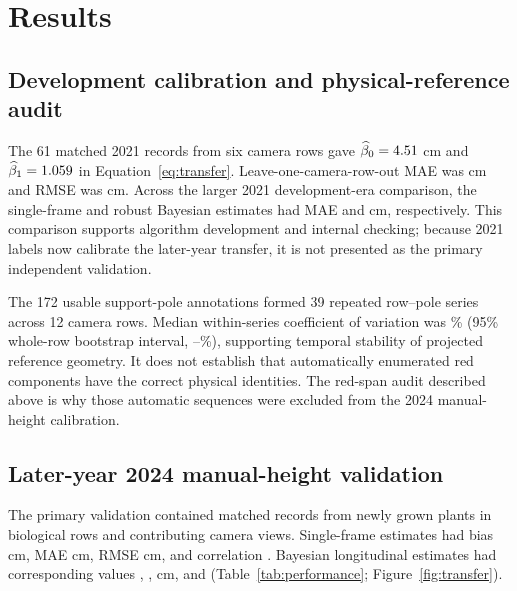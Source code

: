 \documentclass[review,12pt,authoryear]{elsarticle}
\begin{document}
\section{Results}

\subsection{Development calibration and physical-reference audit}

The 61 matched 2021 records from six camera rows gave $\widehat\beta_0=4.51{}$ cm and $\widehat\beta_1=1.059{}$ in Equation~\ref{eq:transfer}. Leave-one-camera-row-out MAE was \TransferDevCVMAE{} cm and RMSE was \TransferDevCVRMSE{} cm. Across the larger 2021 development-era comparison, the single-frame and robust Bayesian estimates had MAE \FieldSingleMAE{} and \FieldBayesMAE{} cm, respectively. This comparison supports algorithm development and internal checking; because 2021 labels now calibrate the later-year transfer, it is not presented as the primary independent validation.

The 172 usable support-pole annotations formed 39 repeated row--pole series across 12 camera rows. Median within-series coefficient of variation was \PoleRepeatabilityMedianCV{}\% (95\% whole-row bootstrap interval, \PoleRepeatabilityMedianCVLo{}--\PoleRepeatabilityMedianCVHi{}\%), supporting temporal stability of projected reference geometry. It does not establish that automatically enumerated red components have the correct physical identities. The red-span audit described above is why those automatic sequences were excluded from the 2024 manual-height calibration.

\subsection{Later-year 2024 manual-height validation}

The primary validation contained \TransferValidationN{} matched records from \TransferValidationPlants{} newly grown plants in \TransferValidationRows{} biological rows and \TransferValidationCameras{} contributing camera views. Single-frame estimates had bias \TransferSingleBias{} cm, MAE \TransferSingleMAE{} cm, RMSE \TransferSingleRMSE{} cm, and correlation \TransferSingleCorrelation{}. Bayesian longitudinal estimates had corresponding values \TransferBayesBias{}, \TransferBayesMAE{}, \TransferBayesRMSE{} cm, and \TransferBayesCorrelation{} (Table~\ref{tab:performance}; Figure~\ref{fig:transfer}).
\end{document}
